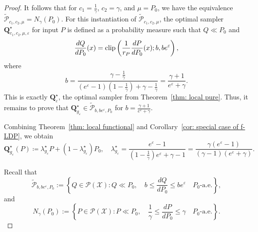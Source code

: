 \documentclass[accepted]{article}
\theoremstyle{plain} %
\theoremstyle{definition}
\theoremstyle{remark}
\newcommand{\eps}{\varepsilon}
\newcommand{\bQ}{\mathbf{Q}}
\newcommand{\ngb}{N_\gamma(P_0)}
\newcommand{\Pt}{\tilde{\mathcal{P}}}
\newcommand{\Ptm}
{\tilde{\mathcal{P}}_{c_1, c_2, \mu}}
\begin{document}
\begin{proof}
It follows that for $c_1 = \frac{1}{\gamma}$, $c_2 = \gamma$, and $\mu = P_0$, we have the equivalence $\Ptm = \ngb$. For this instantiation of $\Ptm$, the optimal sampler $\mathbf{Q}^\star_{c_1,c_2,\mu,\eps}$ for input $P$
is defined as a probability measure such that $Q \ll P_0$ and
\[
\frac{dQ}{dP_0}(x) = \textnormal{clip} \left( \frac{1}{r_P} \frac{dP}{dP_0}(x) ; b, b e^{\eps} \right), 
\]
where
\[
b = \frac{\gamma - \frac{1}{\gamma}}{(e^{\eps} - 1)(1 - \frac{1}{\gamma}) + \gamma - \frac{1}{\gamma}} = \frac{\gamma + 1}{e^\eps + \gamma} .
\]
This is exactly  \( \bQ^\star_\varepsilon \), the optimal sampler from Theorem~\ref{thm: local pure}. Thus, it remains to prove that $\bQ^\star_{g_\varepsilon} \in \Pt_{b,be^\eps,P_0}$ for $b =  \frac{\gamma + 1}{e^\eps + \gamma}$.

Combining Theorem~\ref{thm: local functional} and Corollary~\ref{cor: special case of f-LDP}, we obtain
\[
\bQ^\star_{g_\varepsilon}(P) \coloneqq \lambda^\star_{g_\varepsilon} P + (1 - \lambda^\star_{g_\varepsilon}) P_0, \quad 
\lambda^\star_{g_\varepsilon} = \frac{e^\varepsilon - 1}{(1 - \frac{1}{\gamma})e^\varepsilon + \gamma - 1} = \frac{\gamma(e^\varepsilon - 1)}{(\gamma - 1)(e^\eps + \gamma)}.
\]

Recall that
\[
\tilde{\mathcal{P}}_{b, be^\eps, P_0}
:= \left\{ Q \in \mathcal{P}(\mathcal{X}) : Q \ll P_0, \quad b \leq \frac{dQ}{dP_0} \leq be^\eps \quad P_0\text{-a.e.} \right\},
\]
and
\[
\ngb
:= \left\{ P \in \mathcal{P}(\mathcal{X}) : P \ll P_0, \quad \frac{1}{\gamma} \leq \frac{dP}{dP_0} \leq \gamma \quad P_0\text{-a.e.} \right\}.
\]


\end{proof}
\end{document}
